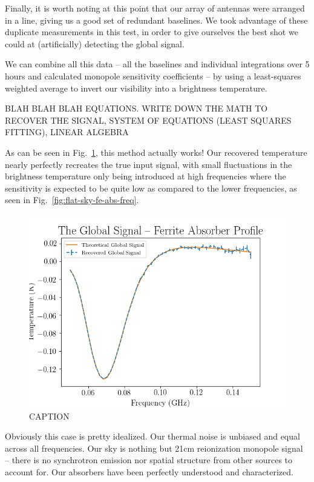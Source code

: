 Finally, it is worth noting at this point that our array of antennas were 
arranged in a line, giving us a good set of redundant baselines. We took 
advantage of these duplicate measurements in this test, in order to give 
ourselves the best shot we could at (artificially) detecting the global signal.

We can combine all this data -- all the baselines and individual integrations 
over 5 hours and calculated monopole sensitivity coefficients -- by using a 
least-squares weighted average to invert our visibility into a brightness 
temperature.

BLAH BLAH BLAH EQUATIONS. WRITE DOWN THE MATH TO RECOVER THE SIGNAL, SYSTEM OF 
EQUATIONS (LEAST SQUARES FITTING), LINEAR ALGEBRA

As can be seen in Fig.~\ref{fig:recovered-ferrite}, this method actually works!  
Our recovered temperature nearly perfectly recreates the true input signal, 
with small fluctuations in the brightness temperature only being introduced at 
high frequencies where the sensitivity is expected to be quite low as compared 
to the lower frequencies, as seen in Fig.~\ref{fig:flat-sky-fe-abs-freq}.

\begin{figure}
    \begin{center}
    \includegraphics[width=\linewidth]{recovered_signal_same_abs.png}
    \end{center}
    \caption{
        CAPTION
    }
    \label{fig:recovered-ferrite}
\end{figure}

Obviously this case is pretty idealized. Our thermal noise is unbiased and 
equal across all frequencies. Our sky is nothing but 21cm reionization monopole 
signal -- there is no synchrotron emission nor spatial structure from other 
sources to account for. Our absorbers have been perfectly understood and 
characterized.

